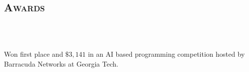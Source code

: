 \begin{resume}






\section{\textsc{Awards}}

\begin{formatb}
  \\
  \body\\
\end{formatb}

\begin{position}
Won first place and $\$3,141$ in an AI based programming competition hosted by Barracuda Networks at Georgia Tech.
\end{position}



\end{resume}
